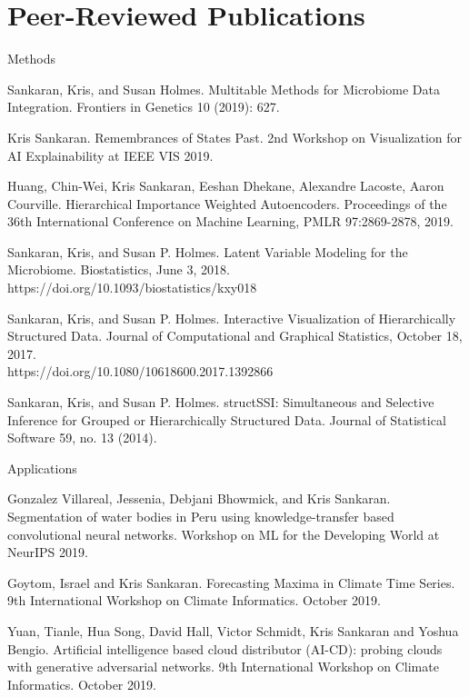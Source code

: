 \documentclass[letterpaper]{article}
\renewenvironment{itemize}{
  \begin{list}{}{
    \setlength{\leftmargin}{1.5em}
  }
}{
  \end{list}
}
\begin{document}
\section*{Peer-Reviewed Publications}
\begin{itemize}
  \item Methods
\begin{itemize}
\item Sankaran, Kris, and Susan Holmes. Multitable Methods for Microbiome Data Integration. Frontiers in Genetics 10 (2019): 627.
\item Kris Sankaran. Remembrances of States Past. 2nd Workshop on
Visualization for AI Explainability at IEEE VIS 2019. 
\item  Huang, Chin-Wei, Kris Sankaran, Eeshan Dhekane, Alexandre Lacoste, Aaron Courville. Hierarchical Importance Weighted Autoencoders.
Proceedings of the 36th International Conference on Machine Learning, PMLR 97:2869-2878, 2019.
 \item Sankaran, Kris, and Susan P. Holmes. Latent Variable Modeling for the
   Microbiome. Biostatistics, June 3, 2018.
   https://doi.org/10.1093/biostatistics/kxy018
 \item Sankaran, Kris, and Susan P. Holmes. Interactive Visualization of
   Hierarchically Structured Data. Journal of Computational and Graphical
   Statistics, October 18, 2017. \\
   https://doi.org/10.1080/10618600.2017.1392866
\item Sankaran, Kris, and Susan P. Holmes. structSSI: Simultaneous and Selective
  Inference for Grouped or Hierarchically Structured Data. Journal of
  Statistical Software 59, no. 13 (2014).
\end{itemize}
\item Applications
  \begin{itemize}
  \item Gonzalez Villareal, Jessenia, Debjani Bhowmick, and Kris Sankaran. Segmentation of water bodies in Peru using knowledge-transfer based convolutional neural networks. Workshop on ML for the Developing World at NeurIPS 2019.
  \item Goytom, Israel and Kris Sankaran. Forecasting Maxima in Climate Time Series. 9th International Workshop on Climate Informatics. October 2019.
  \item Yuan, Tianle, Hua Song, David Hall, Victor Schmidt, Kris Sankaran and Yoshua Bengio. Artificial intelligence based cloud distributor (AI-CD): probing clouds with generative adversarial networks. 9th International Workshop on Climate Informatics. October 2019.

\end{itemize}
\end{itemize}
\end{document}
